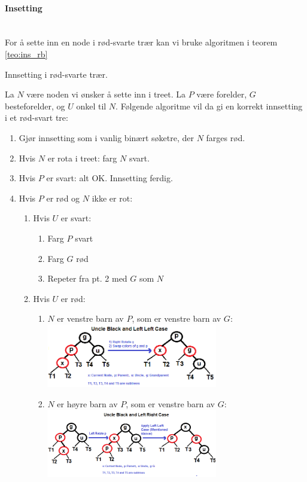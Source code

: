 \paragraph{Insetting}~\\
For å sette inn en node i rød-svarte trær kan vi bruke algoritmen i teorem \ref{teo:ins_rb}
\begin{teorem} Innsetting i rød-svarte trær. \label{teo:ins_rb}

La $ N $ være noden vi ønsker å sette inn i treet. La $ P $ være forelder, $ G $ besteforelder, og $ U $ onkel til $ N $. Følgende algoritme vil da gi en korrekt innsetting i et rød-svart tre:
\begin{enumerate}
\item Gjør innsetting som i vanlig binært søketre, der $ N $ farges rød.
\item Hvis $ N $ er rota i treet: farg $ N $ svart. 
\item Hvis $ P $ er svart: alt OK. Innsetting ferdig. 
\item Hvis $ P $ er rød og $ N $ ikke er rot:
	\begin{enumerate}
		\item Hvis $ U $ er svart:
		\begin{enumerate}
			\item Farg $ P $ svart
			\item Farg $ G $ rød
			\item Repeter fra pt. 2 med $ G $ som $ N $
		\end{enumerate}
		\item Hvis $ U $ er rød:
		\begin{enumerate}
			\item $ N $ er venstre barn av $ P $, som er venstre barn av $ G $:\\
			\includegraphics[width=0.65\textwidth]{fig/rbt_ll.png}\\

			\item $ N $ er høyre barn av $ P $, som er venstre barn av $ G $:\\
			\includegraphics[width=0.65\textwidth]{fig/rbt_lr.png}\\
			

\end{enumerate}
\end{enumerate}
\end{enumerate}
\end{teorem}
